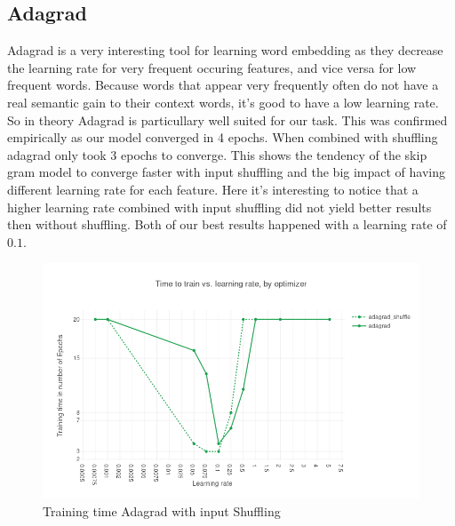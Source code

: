 \subsection{Adagrad}
Adagrad is a very interesting tool for learning word embedding as they decrease the learning rate for very frequent occuring features, and vice versa for low frequent words. Because words that appear very frequently often do not have a real semantic gain to their context words, it's good to have a low learning rate. So in theory Adagrad is particullary well suited for our task. This was confirmed empirically as our model converged in 4 epochs. When combined with shuffling adagrad only took 3 epochs to converge. This shows the tendency of the skip gram model to converge faster with input shuffling and the big impact of having different learning rate for each feature. 
Here it's interesting to notice that a higher learning rate combined with input shuffling did not yield better results then without shuffling. Both of our best results happened with a learning rate of $0.1$. 
\begin{figure}[h]
    \centering
			\includegraphics[scale=0.45]{images/results_adagrad_shuffle} 
    \caption{Training time Adagrad with input Shuffling}
    \label{fig:results_adagrad_shuffle}
\end{figure}
